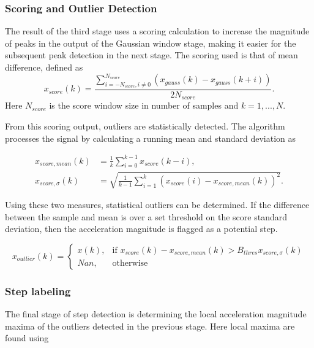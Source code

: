 	

\subsubsection{Scoring and Outlier Detection}
	The result of the third stage uses a scoring calculation to increase the magnitude of peaks in the output of the Gaussian window stage, making it easier for the subsequent peak detection in the next stage.  The scoring used is that of mean difference, defined as 
	\begin{equation}
		x_{score}(k) = \frac{\sum^{N_{score}}_{i=-N_{score}, i \neq 0}\left(x_{gauss}(k)-x_{gauss}(k+i)\right)}{2 N_{score}}.
		\label{eq:mean difference}
	\end{equation}
	Here $N_{score}$ is the score window size in number of samples and $ k = 1,...,N $.\par 

	From this scoring output, outliers are statistically detected. The algorithm processes the signal by calculating a running mean and standard deviation as
	
		\begin{align}\label{key}
		x_{score, mean}(k) &= \frac{1}{k}\sum^{k-1}_{i=0}x_{score}(k-i),\\			
		x_{score,\sigma}(k) &= \sqrt{\frac{1}{k - 1}\sum _{i=1}^{k}\left(x_{score}(i)-x_{score, mean}(k)\right)^{2}}.
	\end{align}
	
	Using these two measures, statistical outliers can be determined. If the difference between the sample and mean is over a set threshold on the score standard deviation, then the acceleration magnitude is flagged as a potential step.
	
	\begin{equation}\label{key}
		x_{outlier}(k) = 
		\begin{cases}
			x(k),& \text{if } x_{score}(k)-x_{score, mean}(k)>B_{thres}x_{score, \sigma}(k)\\
			Nan,              & \text{otherwise}
		\end{cases}
	\end{equation}
	
	
\subsubsection{Step labeling}
	The final stage of step detection is determining the local acceleration magnitude maxima of the outliers detected in the previous stage. Here local maxima are found using
	
